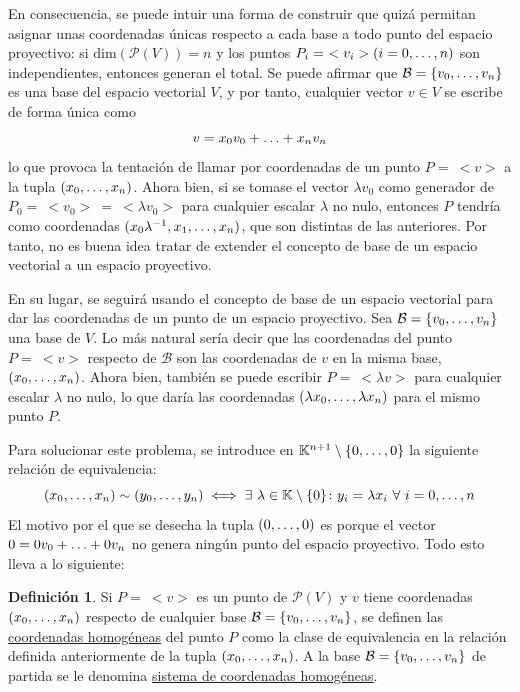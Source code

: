\documentclass[12pt]{report}
\theoremstyle{definition}
\newtheorem{definition}{Definición}[chapter]
\theoremstyle{definition}
\theoremstyle{remark}
\begin{document}
En consecuencia, se puede intuir una forma de construir  que quizá permitan asignar unas coordenadas únicas respecto a cada base a todo punto del espacio proyectivo: si $\mathrm{dim}(\mathcal{P}(V)) = n$ y los puntos $P_i = \ <v_i> (i = 0,\mathellipsis,n)$ son independientes, entonces generan el total. Se puede afirmar que $\mathcal{B} = \{v_0,\mathellipsis,v_n\}$ es una base del espacio vectorial $V$, y por tanto, cualquier vector $v \in V$ se escribe de forma única como \[v = x_0 v_0 + \mathellipsis + x_n v_n\] 
lo que provoca la tentación de llamar por coordenadas de un punto $P = \ <v>$ a la tupla $(x_0,\mathellipsis,x_n)$. Ahora bien, si se tomase el vector $\lambda v_0$ como generador de $P_0 = \ <v_0> \ = \ <\lambda v_0>$ para cualquier escalar $\lambda$ no nulo, entonces $P$ tendría como coordenadas $(x_0 \lambda^{-1},x_1,\mathellipsis,x_n)$, que son distintas de las anteriores. Por tanto, no es buena idea tratar de extender el concepto de base de un espacio vectorial a un espacio proyectivo.

\vspace{2mm}
En su lugar, se seguirá usando el concepto de base de un espacio vectorial para dar las coordenadas de un punto de un espacio proyectivo. Sea $\mathcal{B} = \{v_0,\mathellipsis,v_n\}$ una base de $V$. Lo más natural sería decir que las coordenadas del punto $P = \ <v>$ respecto de $\mathcal{B}$ son las coordenadas de $v$ en la misma base, $(x_0,\mathellipsis,x_n)$. Ahora bien, también se puede escribir $P = \ <\lambda v>$ para cualquier escalar $\lambda$ no nulo, lo que daría las coordenadas $(\lambda  x_0,\mathellipsis,\lambda x_n)$ para el mismo punto $P$.

\vspace{2mm}
Para solucionar este problema, se introduce en $\mathbb{K}^{n+1} \setminus \{0,\mathellipsis,0\}$ la siguiente relación de equivalencia:
\[(x_0,\mathellipsis,x_n) \sim (y_0,\mathellipsis,y_n) \iff \exists \ \lambda \in \mathbb{K} \setminus \{0\} \colon y_i = \lambda x_i \ \forall \ i = 0,\mathellipsis,n\]
El motivo por el que se desecha la tupla $(0,\mathellipsis,0)$ es porque el vector $0 = 0v_0+\mathellipsis+0v_n$ no genera ningún punto del espacio proyectivo. Todo esto lleva a lo siguiente:

\begin{definition}
Si $P = \ <v>$ es un punto de $\mathcal{P}(V)$ y $v$ tiene coordenadas $(x_0,\mathellipsis,x_n)$ respecto de cualquier base $\mathcal{B}=\{v_0,\mathellipsis,v_n\}$, se definen las \ul{coordenadas homogéneas} del punto $P$ como la clase de equivalencia en la relación definida anteriormente de la tupla $(x_0,\mathellipsis,x_n)$. A la base $\mathcal{B} = \{v_0,\mathellipsis,v_n\}$ de partida se le denomina \ul{sistema de coordenadas homogéneas}.
\end{definition}
\end{document}
